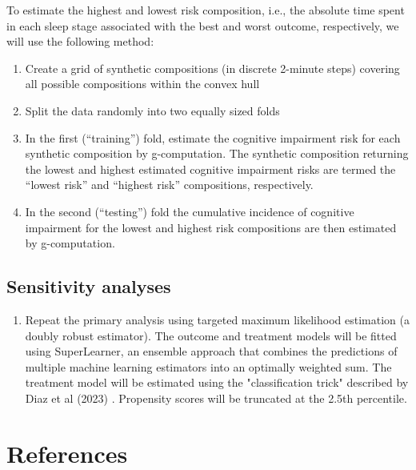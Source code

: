 \documentclass{article}
\begin{document}
To estimate the highest and lowest risk composition, i.e., the absolute time spent in each sleep stage associated with the best and worst outcome, respectively, we will use the following method:
\begin{enumerate}
    \item Create a grid of synthetic compositions (in discrete 2-minute steps) covering all possible compositions within the convex hull
    \item Split the data randomly into two equally sized folds
    \item In the first (“training”) fold, estimate the cognitive impairment risk for each synthetic composition by g-computation. The synthetic composition returning the lowest and highest estimated cognitive impairment risks are termed the “lowest risk” and “highest risk” compositions, respectively.
    \item In the second (“testing”) fold the cumulative incidence of cognitive impairment for the lowest and highest risk compositions are then estimated by g-computation.
\end{enumerate}

\subsection{Sensitivity analyses}
\begin{enumerate}
    \item Repeat the primary analysis using targeted maximum likelihood estimation (a doubly robust estimator). The outcome and treatment models will be fitted using SuperLearner, an ensemble approach that combines the predictions of multiple machine learning estimators into an optimally weighted sum. The treatment model will be estimated using the "classification trick" described by Diaz et al (2023) \cite{diazNonparametricCausalEffects2023a}. Propensity scores will be truncated at the 2.5th percentile.
\end{enumerate}


\section{References}


\end{document}
